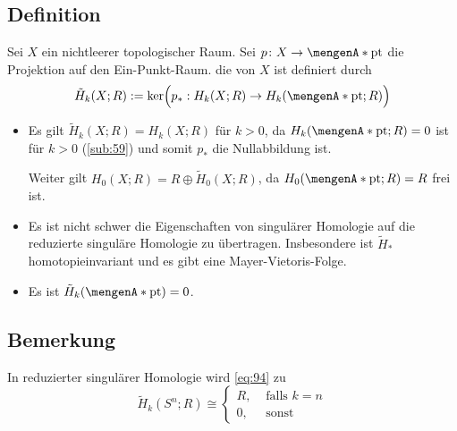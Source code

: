 \subsection[Definition: Reduzierte Homologie]{Definition} %
\label{sub:95}
Sei $X$ ein nichtleerer topologischer Raum. Sei $p \colon X  \to \set{\mathrm{pt}}$ die Projektion auf den Ein-Punkt-Raum. die  von $X$ ist definiert
durch 
\[
	\tilde{H}_k(X;R) := \ker \enbrace[\Big]{ p_* : H_k(X;R) \to H_k(\set{\mathrm{pt}};R )} 
\]
\begin{itemize}
	\item Es gilt $\tilde{H}_k(X;R) =H_k(X;R)$ für $k>0$, da $H_k \enbrace*{\set{\mathrm{pt}};R }=0$ ist für $k>0$ (\ref{sub:59}) und somit $p_*$ die Nullabbildung ist.
	
	Weiter gilt $H_0(X;R) = R \oplus \tilde{H}_0(X;R)$, da $H_0(\set{\mathrm{pt}};R)=R$ frei ist.
	\item Es ist nicht schwer die Eigenschaften von singulärer Homologie auf die reduzierte singuläre Homologie zu übertragen. Insbesondere ist $\tilde{H}_*$ 
	homotopieinvariant und es gibt eine Mayer-Vietoris-Folge.
	\item Es ist $\tilde{H}_k \enbrace*{\set{\mathrm{pt}}}=0$.
\end{itemize}

\subsection[Bemerkung: Die Aussage von Satz \ref{sub:94} in reduzierter Homologie]{Bemerkung} %
\label{sub:96}
In reduzierter singulärer Homologie wird \eqref{eq:94} zu
\begin{equation*}
	\tilde{H}_k(S^n;R) \cong \begin{cases}
		R, &\text{ falls }k=n\\
		0 , &\text{ sonst}
	\end{cases} \label{eq:96}\tag{\#\#}
\end{equation*}

